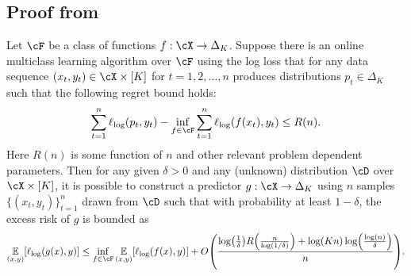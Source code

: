 \subsection{Proof from }
\label{app:o2b_proof}

\begin{theorem}
\label{thm:o2b_high_prob}
Let $\cF$ be a class of functions $f: \cX \rightarrow \Delta_K$. Suppose there is an online multiclass learning algorithm over $\cF$ using the log loss that for any data sequence $(x_t, y_t) \in \cX \times [K]$ for $t = 1, 2, \ldots, n$ produces distributions $p_t \in \Delta_K$ such that the following regret bound holds:
\[ \sum_{t=1}^n \logloss(p_t, y_t) - \inf_{f \in \cF}\sum_{t=1}^n \logloss(f(x_t), y_t) \leq R(n).\]
Here $R(n)$ is some function of $n$ and other relevant problem dependent parameters. Then for any given $\delta > 0$ and any (unknown) distribution $\cD$ over $\cX \times [K]$, it is possible to construct a predictor $g: \cX \rightarrow \Delta_K$ using $n$ samples $\{(x_t, y_t)\}_{t=1}^n$ drawn from $\cD$ such that with probability at least $1-\delta$, the excess risk of $g$ is bounded as
\[ \En_{(x, y)}[\logloss(g(x), y)] \leq \inf_{f \in \cF} \En_{(x, y)}[\logloss(f(x), y)] + O\prn*{\frac{\log\prn*{\frac{1}{\delta}}R\prn*{\frac{n}{\log(1/\delta)}} + \log(Kn)\log\prn*{\frac{\log(n)}{\delta}}}{n}}.
\]
\end{theorem}

